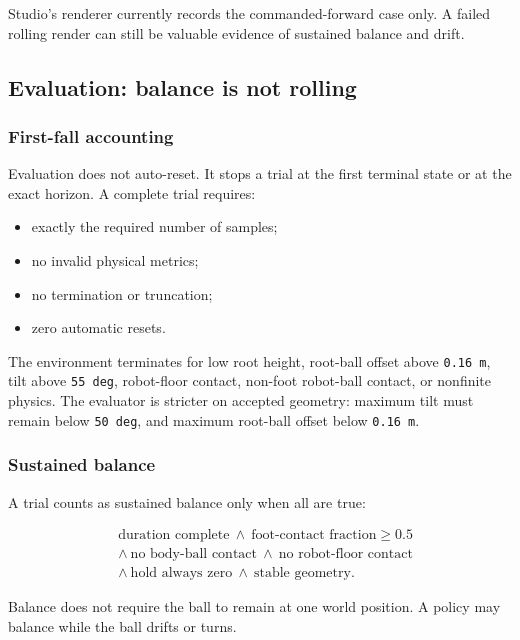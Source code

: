 \documentclass[
  american,
  11pt,
  letterpaper,
]{article}
\providecommand{\tightlist}{%
  \setlength{\itemsep}{0pt}\setlength{\parskip}{0pt}}
\begin{document}
Studio's renderer currently records the commanded-forward case only. A
failed rolling render can still be valuable evidence of sustained
balance and drift.

\subsection{Evaluation: balance is not
rolling}\label{evaluation-balance-is-not-rolling}

\subsubsection{First-fall accounting}\label{first-fall-accounting}

Evaluation does not auto-reset. It stops a trial at the first terminal
state or at the exact horizon. A complete trial requires:

\begin{itemize}
\tightlist
\item
  exactly the required number of samples;
\item
  no invalid physical metrics;
\item
  no termination or truncation;
\item
  zero automatic resets.
\end{itemize}

The environment terminates for low root height, root-ball offset above
\texttt{0.16\ m}, tilt above \texttt{55\ deg}, robot-floor contact,
non-foot robot-ball contact, or nonfinite physics. The evaluator is
stricter on accepted geometry: maximum tilt must remain below
\texttt{50\ deg}, and maximum root-ball offset below \texttt{0.16\ m}.

\subsubsection{Sustained balance}\label{sustained-balance}

A trial counts as sustained balance only when all are true:

\[
\begin{aligned}
&\text{duration complete}\ \land\ \text{foot-contact fraction}\ge0.5\\
&\land\ \text{no body-ball contact}\ \land\ \text{no robot-floor contact}\\
&\land\ \text{hold always zero}\ \land\ \text{stable geometry}.
\end{aligned}
\]

Balance does not require the ball to remain at one world position. A
policy may balance while the ball drifts or turns.
\end{document}
